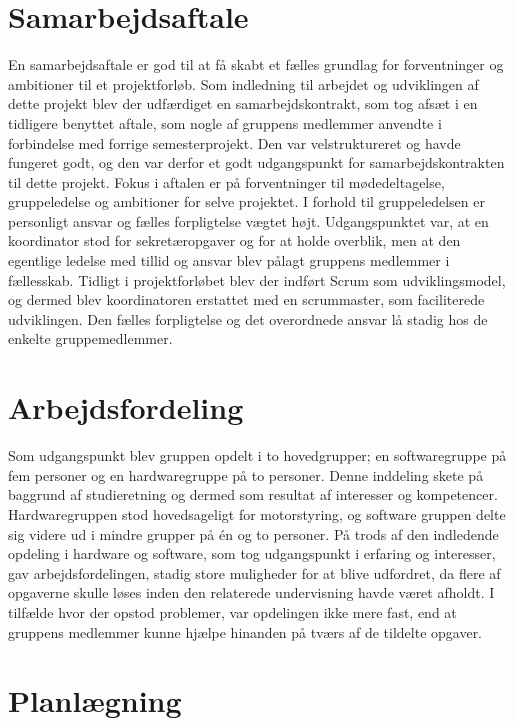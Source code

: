 \section{Samarbejdsaftale}
En samarbejdsaftale er god til at få skabt et fælles grundlag for forventninger og ambitioner til et projektforløb. Som indledning til arbejdet og udviklingen af dette projekt blev der udfærdiget en samarbejdskontrakt, som tog afsæt i en tidligere benyttet aftale, som nogle af gruppens medlemmer anvendte i forbindelse med forrige semesterprojekt. Den var velstruktureret og havde fungeret godt, og den var derfor et godt udgangspunkt for samarbejdskontrakten til dette projekt. Fokus i aftalen er på forventninger til mødedeltagelse, gruppeledelse og ambitioner for selve projektet. I forhold til gruppeledelsen er personligt ansvar og fælles forpligtelse vægtet højt. Udgangspunktet var, at en koordinator stod for sekretæropgaver og for at holde overblik, men at den egentlige ledelse med tillid og ansvar blev pålagt gruppens medlemmer i fællesskab. Tidligt i projektforløbet blev der indført Scrum som udviklingsmodel, og dermed blev koordinatoren erstattet med en scrummaster, som faciliterede udviklingen. Den fælles forpligtelse og det overordnede ansvar lå stadig hos de enkelte gruppemedlemmer.

\section{Arbejdsfordeling}
Som udgangspunkt blev gruppen opdelt i to hovedgrupper; en softwaregruppe på fem personer og en hardwaregruppe på to personer. Denne inddeling skete på baggrund af studieretning og dermed som resultat af interesser og kompetencer. Hardwaregruppen stod hovedsageligt for motorstyring, og software gruppen delte sig videre ud i mindre grupper på én og to personer. På trods af den indledende opdeling i hardware og software, som tog udgangspunkt i erfaring og interesser, gav arbejdsfordelingen, stadig store muligheder for at blive udfordret, da flere af opgaverne skulle løses inden den relaterede undervisning havde været afholdt. I tilfælde hvor der opstod problemer, var opdelingen ikke mere fast, end at gruppens medlemmer kunne hjælpe hinanden på tværs af de tildelte opgaver. \\

\section{Planlægning}

